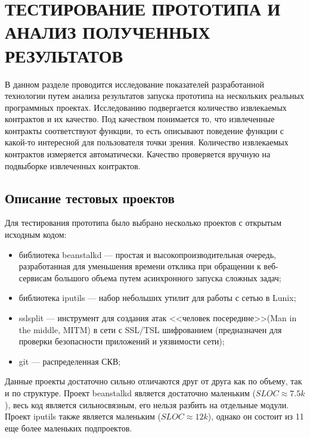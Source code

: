 \chapter{ТЕСТИРОВАНИЕ ПРОТОТИПА И АНАЛИЗ ПОЛУЧЕННЫХ РЕЗУЛЬТАТОВ}
\label{chapter:testing}
В данном разделе проводится исследование показателей разработанной технологии путем анализа результатов запуска прототипа на нескольких реальных программных проектах. Исследованию подвергается количество извлекаемых контрактов и их качество. Под качеством понимается то, что извлеченные контракты соответствуют функции, то есть описывают поведение функции с какой-то интересной для пользователя точки зрения. Количество извлекаемых контрактов измеряется автоматически. Качество проверяется вручную на подвыборке извлеченных контрактов.

\section{Описание тестовых проектов}
Для тестирования прототипа было выбрано несколько проектов с открытым исходным кодом:
\begin{itemize}
\item библиотека beanstalkd --- простая и высокопроизводительная очередь, разработанная для уменьшения времени отклика при обращении к веб-сервисам большого объема путем асинхронного запуска сложных задач;
\item библиотека iputils --- набор небольших утилит для работы с сетью в Lunix;
\item sslsplit --- инструмент для создания атак <<человек посередине>>(Man in the middle, MITM) в сети с SSL/TSL шифрованием (предназначен для проверки безопасности приложений и уязвимости сети);
\item git --- распределенная СКВ;
\end{itemize}

Данные проекты достаточно сильно отличаются друг от друга как по объему, так и по структуре. Проект beanstalkd является достаточно маленьким ($SLOC \approx 7.5k$), весь код является сильносвязным, его нельзя разбить на отдельные модули. Проект iputils также является маленьким ($SLOC \approx 12k$), однако он состоит из 11 еще более маленьких подпроектов.

